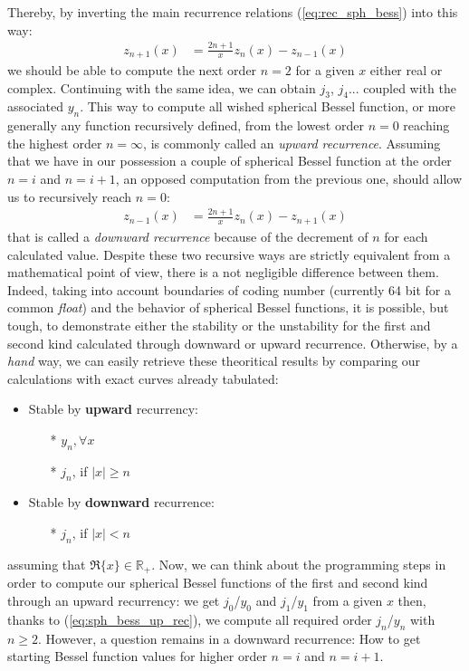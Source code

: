 \documentclass{article}
\numberwithin{equation}{section}
\begin{document}
Thereby, by inverting the main recurrence relations (\ref{eq:rec_sph_bess}) into this way:
\begin{align}\label{eq:sph_bess_up_rec}
z_{n+1}(x) &= \frac{2n+1}{x}z_{n}(x) - z_{n-1}(x)
\end{align}
we should be able to compute the next order $n=2$ for a given $x$ either real or complex. Continuing with the same idea, we can obtain $j_{3}$, $j_{4}$... coupled with the associated $y_{n}$. This way to compute all wished spherical Bessel function, or more generally any function recursively defined, from the lowest order $n=0$ reaching the highest order $n=\infty$, is commonly called an \textit{upward recurrence}. Assuming that we have in our possession a couple of spherical Bessel function at the order $n=i$ and $n=i+1$, an opposed computation from the previous one, should allow us to recursively reach $n=0$: 
\begin{align}\label{eq:sph_bess_down_rec}
z_{n-1}(x) &= \frac{2n+1}{x}z_{n}(x) - z_{n+1}(x)
\end{align}
that is called a \textit{downward recurrence} because of the decrement of $n$ for each calculated value. Despite these two recursive ways are strictly equivalent from a mathematical point of view, there is a not negligible difference between them. Indeed, taking into account boundaries of coding number (currently 64 bit for a common \textit{float}) and the behavior of spherical Bessel functions, it is possible, but tough, to demonstrate either the stability or the unstability for the first and second kind calculated through downward or upward recurrence. Otherwise, by a \textit{hand} way, we can easily retrieve these theoritical results by comparing our calculations with exact curves already tabulated:
\begin{itemize}
\item Stable by \textbf{upward} recurrency: 
\begin{itemize}
\item[*]$y_{n}, \forall x$
\item[*]$j_{n}$, if $|x| \geqslant n$
\end{itemize}
\item Stable by \textbf{downward} recurrence:
\begin{itemize}
\item[*]$j_{n}$, if $|x| < n$
\end{itemize}
\end{itemize}
assuming that $\Re\{x\} \in\mathbb{R}_{+}$. Now, we can think about the programming steps in order to compute our spherical Bessel functions of the first and second kind through an upward recurrency: we get $j_{0}$/$y_{0}$ and $j_{1}$/$y_{1}$ from a given $x$ then, thanks to (\ref{eq:sph_bess_up_rec}), we compute all required order $j_{n}$/$y_{n}$ with $n \geqslant 2$. However, a question remains in a downward recurrence: How to get starting Bessel function values for higher order $n=i$ and $n=i+1$.
\end{document}
